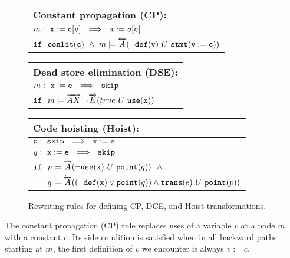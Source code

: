 \begin{figure}[ht]

\begin{small}

\begin{tabularx}{0.8\textwidth}{|X|}\hline
{\bf Constant propagation} (CP):\\\hline
$m: ~ {\tt x:=e[v]} ~~ \Longrightarrow ~~ {\tt x:=e[c]}$ \\
${\tt if} ~~ \text{${\tt conlit}$}(\text{${\tt c}$}) ~ \wedge ~ m \models \overleftarrow{A}(\neg\text{${\tt def}$}(\text{${\tt v}$}) ~ U ~ \text{${\tt stmt}$}({\tt v:=c}))$ \\\hline
\end{tabularx}

\vspace{2mm}

\begin{tabularx}{0.8\textwidth}{|X|}\hline
{\bf Dead store elimination} (DSE):\\\hline
$m: ~ {\tt x:=e} ~~ \Longrightarrow ~~ {\tt skip}$ \\
${\tt if} ~~ m \models \overrightarrow{AX} ~ \neg\overrightarrow{E}(true ~ U ~ \text{${\tt use}$}(\text{${\tt x}$}))$ \\\hline
\end{tabularx}

\vspace{2mm}

\begin{tabularx}{0.8\textwidth}{|X|}\hline
{\bf Code hoisting} (Hoist):\\\hline
$p: ~ {\tt skip} ~~ \Longrightarrow ~~ {\tt x:=e}$ \\
$q: ~ {\tt x:=e} ~~ \Longrightarrow ~~ {\tt skip}$ \\
${\tt if} ~~ p \models \overrightarrow{A}(\neg\text{${\tt use}$}(\text{${\tt x}$}) ~ U ~ \text{${\tt point}$}(q)) ~~ \wedge$ \\
$\hphantom{\texttt{if}} ~~ q \models \overleftarrow{A}((\neg\wdef(\wx)\vee\wpoint(q))\wedge \wtrans(e) ~ U ~ \wpoint(p))$ \\\hline
\end{tabularx}

\end{small}
\caption{\label{fig:sample-trans} Rewriting rules for defining CP, DCE, and Hoist transformations.}
\end{figure}

The constant propagation (CP) rule replaces uses of a variable $v$ at a node $m$ with a constant $c$. Its side condition is satisfied when in all backward paths starting at $m$, the first definition of $v$ we encounter is always $v:=c$.


